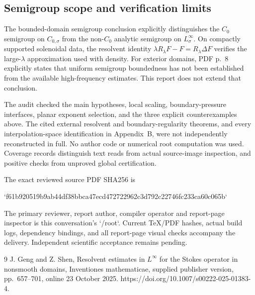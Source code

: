 \documentclass[10pt]{article}
\begin{document}
\subsection*{Semigroup scope and verification limits}
The bounded-domain semigroup conclusion explicitly distinguishes the \(C_0\) semigroup on \(C_{0,\sigma}\) from the non-\(C_0\) analytic semigroup on \(L^\infty_\sigma\). On compactly supported solenoidal data, the resolvent identity \(\lambda R_\lambda F-F=R_\lambda\Delta F\) verifies the large-\(\lambda\) approximation used with density. For exterior domains, PDF p. 8 explicitly states that uniform semigroup boundedness has not been established from the available high-frequency estimates. This report does not extend that conclusion.\par
The audit checked the main hypotheses, local scaling, boundary-pressure interfaces, planar exponent selection, and the three explicit counterexamples above. The cited external resolvent and boundary-regularity theorems, and every interpolation-space identification in Appendix B, were not independently reconstructed in full. No author code or numerical root computation was used. Coverage records distinguish text reads from actual source-image inspection, and positive checks from unproved global certification.\par
The exact reviewed source PDF SHA256 is\par
`f61b920519b9ab44df38bbca47ecd472722962c3d792c22746fc233ca60c065b`\par
The primary reviewer, report author, compiler operator and report-page inspector is this conversation’s `/root`. Current TeX/PDF hashes, actual build logs, dependency bindings, and all report-page visual checks accompany the delivery. Independent scientific acceptance remains pending.\par
9 J. Geng and Z. Shen, Resolvent estimates in \(L^\infty\) for the Stokes operator in nonsmooth domains, Inventiones mathematicae, supplied publisher version, pp. 657–701, online 23 October 2025. https://doi.org/10.1007/s00222-025-01383-4.\par
\end{document}
